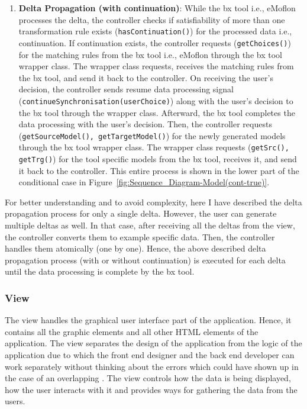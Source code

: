 \begin{enumerate}
	\item {\textbf{Delta Propagation (with continuation)}: While the bx tool i.e., eMoflon processes the delta, the controller checks if satisfiability of more than one transformation rule exists (\texttt{hasContinuation()}) for the processed data i.e., continuation. If continuation exists, the controller requests (\texttt{getChoices()}) for the matching rules from the bx tool i.e., eMoflon through the bx tool wrapper class. The wrapper class requests, receives the matching rules from the bx tool, and send it back to the controller. On receiving the user's decision, the controller sends resume data processing signal (\texttt{continueSynchronisation(userChoice)}) along with the user's decision to the bx tool through the wrapper class. Afterward, the bx tool completes the data processing with the user's decision. Then, the controller requests (\texttt{getSourceModel(), getTargetModel()}) for the newly generated models through the bx tool wrapper class. The wrapper class requests (\texttt{getSrc(), getTrg()}) for the tool specific models from the bx tool, receives it, and send it back to the controller. This entire process is shown in the lower part of the conditional case in Figure~\ref{fig:Sequence_Diagram-Model(cont-true)}.}
\end{enumerate}

For better understanding and to avoid complexity, here I have described the delta propagation process for only a single delta. However, the user can generate multiple deltas as well. In that case, after receiving all the deltas from the view, the controller converts them to example specific data. Then, the controller handles them atomically (one by one). Hence, the above described delta propagation process (with or without continuation) is executed for each delta until the data processing is complete by the bx tool. 

\subsubsection{View}\label{subsubsec:design_view}
The view handles the graphical user interface part of the application. Hence, it contains all the graphic elements and all other HTML elements of the application. The view separates the design of the application from the logic of the application due to which the front end designer and the back end developer can work separately without thinking about the errors which could have shown up in the case of an overlapping \cite{designpattern-headfirst} \cite{mvc-arch}. The view controls how the data is being displayed, how the user interacts with it and provides ways for gathering the data from the users.

